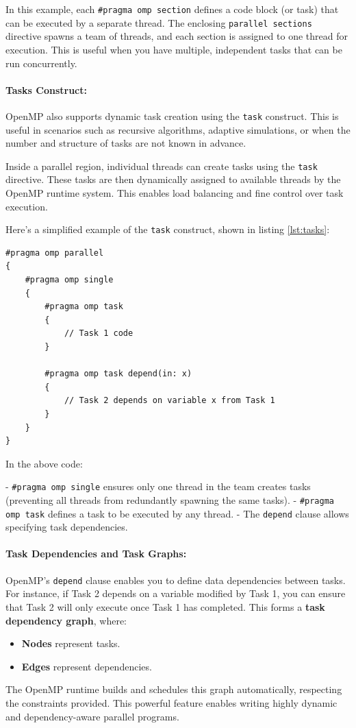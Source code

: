 \documentclass[12pt]{book}
\begin{document}
In this example, each \texttt{\#pragma omp section} defines a code block (or task) that can be executed by a separate thread. The enclosing \texttt{parallel sections} directive spawns a team of threads, and each section is assigned to one thread for execution. This is useful when you have multiple, independent tasks that can be run concurrently.

\paragraph{Tasks Construct:}

OpenMP also supports dynamic task creation using the \texttt{task} construct. This is useful in scenarios such as recursive algorithms, adaptive simulations, or when the number and structure of tasks are not known in advance.

Inside a parallel region, individual threads can create tasks using the \texttt{task} directive. These tasks are then dynamically assigned to available threads by the OpenMP runtime system. This enables load balancing and fine control over task execution.

Here’s a simplified example of the \texttt{task} construct, shown in listing \ref{lst:tasks}:

\begin{lstlisting}[style=cppstyle, caption={Tasks Construct}, captionpos=b, label={lst:tasks}]
#pragma omp parallel
{
    #pragma omp single
    {
        #pragma omp task
        {
            // Task 1 code
        }

        #pragma omp task depend(in: x)
        {
            // Task 2 depends on variable x from Task 1
        }
    }
}
\end{lstlisting}

In the above code:

- \texttt{\#pragma omp single} ensures only one thread in the team creates tasks (preventing all threads from redundantly spawning the same tasks).
- \texttt{\#pragma omp task} defines a task to be executed by any thread.
- The \texttt{depend} clause allows specifying task dependencies.

\paragraph{Task Dependencies and Task Graphs:}

OpenMP's \texttt{depend} clause enables you to define data dependencies between tasks. For instance, if Task 2 depends on a variable modified by Task 1, you can ensure that Task 2 will only execute once Task 1 has completed. This forms a \textbf{task dependency graph}, where:
\begin{itemize}
\item \textbf{Nodes} represent tasks.
\item \textbf{Edges} represent dependencies.
\end{itemize}
The OpenMP runtime builds and schedules this graph automatically, respecting the constraints provided. This powerful feature enables writing highly dynamic and dependency-aware parallel programs.
\end{document}
